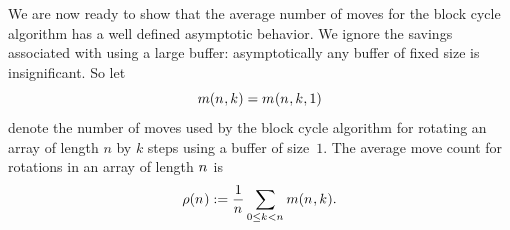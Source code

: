 
  We are now ready to show that the average number of moves for the block cycle
  algorithm has a well defined asymptotic behavior. We ignore the
  savings associated with using a large buffer: asymptotically any buffer of
  fixed size is insignificant. So let
  \[
    \MovesOf{\Size}{\Shift} = \CostOf{\Size,\Shift,1}
  \]
  denote the number of moves used by the block cycle algorithm for rotating
  an array of length $n$ by $k$ steps using a buffer of size~$1$.
  The average move count for rotations in an array of length $n_{}$ is
  \[
    \rho(n_{})
    :=
    \frac{1}{n_{}}\sum_{0\leq k_{} < n_{}}
    m(n_{},k_{})
    .
  \]

